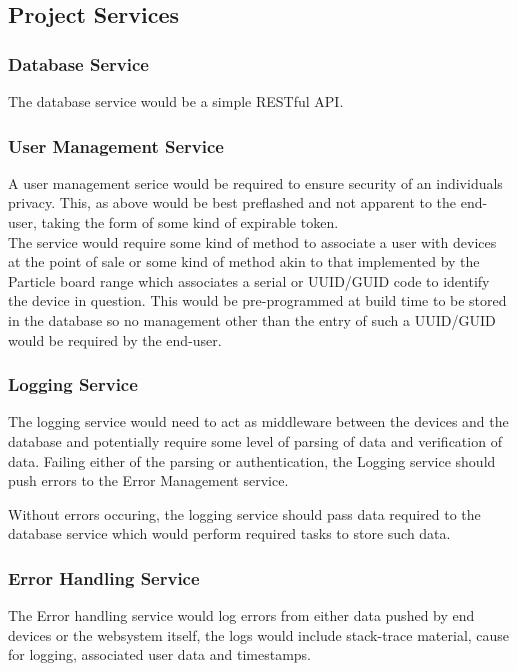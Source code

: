 \documentclass{article}
\begin{document}
        \subsection{Project Services}
            \subsubsection{Database Service}
            The database service would be a simple RESTful API.

            \subsubsection{User Management Service}
            A user management serice would be required to ensure security of an individuals privacy.
            This, as above would be best preflashed and not apparent to the end-user, taking the form of
            some kind of expirable token.
            \\
            The service would require some kind of method to associate a user with devices at the point of sale
            or some kind of method akin to that implemented by the Particle board range \cite{Particle}
            which associates a serial or UUID/GUID code to identify the device in question.
            This would be pre-programmed at build time to be stored in the database so no management 
            other than the entry of such a UUID/GUID would be required by the end-user.

            \subsubsection{Logging Service}
            The logging service would need to act as middleware between the devices and the database and 
            potentially require some level of parsing of data and verification of data. Failing either of the
            parsing or authentication, the Logging service should push errors to the Error Management service.
            \par
            Without errors occuring, the logging service should pass data required to the database service which
            would perform required tasks to store such data.

            \subsubsection{Error Handling Service}
            The Error handling service would log errors from either data pushed by end devices or the websystem itself,
            the logs would include stack-trace material, cause for logging, associated user data and timestamps.
\end{document}
